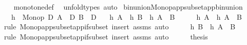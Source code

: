 \begin{isabellebody}
%
\isadelimproof
\ \ %
\endisadelimproof
%
\isatagproof
{}\isamarkupfalse%
\ monotone{\isacharunderscore}{\kern0pt}def\ \isamarkupfalse%
\ unfold{\isacharunderscore}{\kern0pt}types\ auto%
\endisatagproof
{\isafoldproof}%
%
\isadelimproof
\isanewline
%
\endisadelimproof
\isanewline
{}\isamarkupfalse%
\ bin{\isacharunderscore}{\kern0pt}union{\isacharunderscore}{\kern0pt}Monop{\isacharunderscore}{\kern0pt}app{\isacharunderscore}{\kern0pt}subset{\isacharunderscore}{\kern0pt}app{\isacharunderscore}{\kern0pt}bin{\isacharunderscore}{\kern0pt}union{\isacharcolon}{\kern0pt}\isanewline
\ \ \ {\isachardoublequoteopen}h\ {\isacharcolon}{\kern0pt}\ Monop\ D{\isachardoublequoteclose}\ {\isachardoublequoteopen}A\ {\isasymsubseteq}\ D{\isachardoublequoteclose}\ {\isachardoublequoteopen}B\ {\isasymsubseteq}\ D{\isachardoublequoteclose}\isanewline
\ \ \ {\isachardoublequoteopen}h\ A\ {\isasymunion}\ h\ B\ {\isasymsubseteq}\ h\ {\isacharparenleft}{\kern0pt}A\ {\isasymunion}\ B{\isacharparenright}{\kern0pt}{\isachardoublequoteclose}\isanewline
%
\isadelimproof
%
\endisadelimproof
%
\isatagproof
{}\isamarkupfalse%
\ {\isacharminus}{\kern0pt}\isanewline
\ \ \isamarkupfalse%
\ {\isachardoublequoteopen}h\ A\ {\isasymsubseteq}\ h\ {\isacharparenleft}{\kern0pt}A\ {\isasymunion}\ B{\isacharparenright}{\kern0pt}{\isachardoublequoteclose}\isanewline
\ \ \ \ \isamarkupfalse%
\ {\isacharparenleft}{\kern0pt}rule\ Monop{\isacharunderscore}{\kern0pt}app{\isacharunderscore}{\kern0pt}subset{\isacharunderscore}{\kern0pt}app{\isacharunderscore}{\kern0pt}if{\isacharunderscore}{\kern0pt}subset{\isacharparenright}{\kern0pt}\ {\isacharparenleft}{\kern0pt}insert\ assms{\isacharcomma}{\kern0pt}\ auto{\isacharparenright}{\kern0pt}\isanewline
\ \ \isamarkupfalse%
\ \isamarkupfalse%
\ {\isachardoublequoteopen}h\ B\ {\isasymsubseteq}\ h\ {\isacharparenleft}{\kern0pt}A\ {\isasymunion}\ B{\isacharparenright}{\kern0pt}{\isachardoublequoteclose}\isanewline
\ \ \ \ \isamarkupfalse%
\ {\isacharparenleft}{\kern0pt}rule\ Monop{\isacharunderscore}{\kern0pt}app{\isacharunderscore}{\kern0pt}subset{\isacharunderscore}{\kern0pt}app{\isacharunderscore}{\kern0pt}if{\isacharunderscore}{\kern0pt}subset{\isacharparenright}{\kern0pt}\ {\isacharparenleft}{\kern0pt}insert\ assms{\isacharcomma}{\kern0pt}\ auto{\isacharparenright}{\kern0pt}\isanewline
\ \ \isamarkupfalse%
\ \isamarkupfalse%
\ {\isacharquery}{\kern0pt}thesis\ \isamarkupfalse%

\end{isabellebody}
